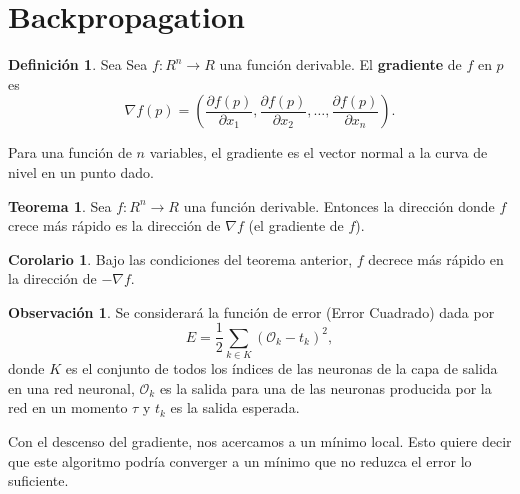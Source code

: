 \documentclass[12pt,letterpaper]{article}
\theoremstyle{definition}
\newtheorem{defi}{Definici\'on}[section]
\theoremstyle{definition}
\newtheorem{obs}{Observaci\'on}
\theoremstyle{definition}
\theoremstyle{definition}
\theoremstyle{definition}
\newtheorem{teo}{Teorema}
\theoremstyle{definition}
\newtheorem{cor}{Corolario}
\begin{document}
\section{Backpropagation}
	\begin{defi}
		Sea Sea $ f: R^n\to R $ una función derivable. El \textbf{gradiente} de $ f $  en $ p $ es
		\[ \nabla f (p) =\left(\dfrac{\partial f(p)}{\partial x_1}, \dfrac{\partial f(p)}{\partial x_2}, \dots, \dfrac{\partial f(p)}{\partial x_n}\right). \]
	\end{defi}
	Para una función de $ n $ variables, el gradiente es el vector normal a la curva de nivel en un punto dado.

\begin{teo}
	Sea $ f: R^n\to R $ una funci\'on derivable. Entonces la direcci\'on donde $ f $ crece m\'as r\'apido es la direcci\'on de $ \nabla f $ (el gradiente de $ f $).
\end{teo}
	\begin{cor}
		Bajo las condiciones del teorema anterior, $ f $ decrece más rápido en la dirección de $ -\nabla f $.
	\end{cor}
	
\begin{obs}
	Se considerará la funci\'on de error (Error Cuadrado) dada por 
	\begin{equation*}
		E=\dfrac{1}{2}\sum_{k\in K} (\mathcal{O}_{k}-t_{k})^2,
	\end{equation*}
	donde $ K $ es el conjunto de todos los índices de las neuronas de la capa de salida en una red neuronal, $ \mathcal{O}_k $ es la salida  para una de las neuronas producida por la red en un momento $ \tau $ y $ t_{k} $ es la salida esperada. 
\end{obs}
Con el descenso del gradiente, nos acercamos a un mínimo local. Esto quiere decir que este algoritmo podría converger a un mínimo que no reduzca el error lo suficiente.
\begin{center}
\end{center}
\end{document}
